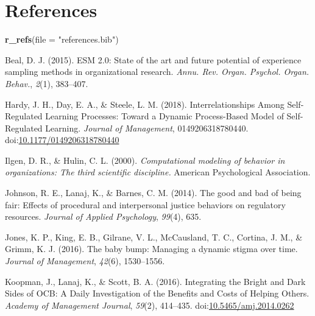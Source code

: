 \documentclass[english,,man]{apa6}
\newenvironment{Shaded}{\begin{snugshade}}{\end{snugshade}}
\newcommand{\DataTypeTok}[1]{\textcolor[rgb]{0.13,0.29,0.53}{#1}}
\newcommand{\KeywordTok}[1]{\textcolor[rgb]{0.13,0.29,0.53}{\textbf{#1}}}
\newcommand{\NormalTok}[1]{#1}
\newcommand{\StringTok}[1]{\textcolor[rgb]{0.31,0.60,0.02}{#1}}
\theoremstyle{definition}
\theoremstyle{definition}
\theoremstyle{definition}
\theoremstyle{remark}
\begin{document}
\newpage

\hypertarget{references}{%
\section{References}\label{references}}

\begin{Shaded}
\begin{Highlighting}[]
\KeywordTok{r_refs}\NormalTok{(}\DataTypeTok{file =} \StringTok{"references.bib"}\NormalTok{)}
\end{Highlighting}
\end{Shaded}

\setlength{\parindent}{-0.5in}
\setlength{\leftskip}{0.5in}

\hypertarget{refs}{}
\leavevmode\hypertarget{ref-beal_esm_2015}{}%
Beal, D. J. (2015). ESM 2.0: State of the art and future potential of
experience sampling methods in organizational research. \emph{Annu. Rev.
Organ. Psychol. Organ. Behav.}, \emph{2}(1), 383--407.

\leavevmode\hypertarget{ref-hardy_interrelationships_2018}{}%
Hardy, J. H., Day, E. A., \& Steele, L. M. (2018). Interrelationships
Among Self-Regulated Learning Processes: Toward a Dynamic Process-Based
Model of Self-Regulated Learning. \emph{Journal of Management},
0149206318780440.
doi:\href{https://doi.org/10.1177/0149206318780440}{10.1177/0149206318780440}

\leavevmode\hypertarget{ref-ilgen_computational_2000}{}%
Ilgen, D. R., \& Hulin, C. L. (2000). \emph{Computational modeling of
behavior in organizations: The third scientific discipline.} American
Psychological Association.

\leavevmode\hypertarget{ref-johnson_good_2014}{}%
Johnson, R. E., Lanaj, K., \& Barnes, C. M. (2014). The good and bad of
being fair: Effects of procedural and interpersonal justice behaviors on
regulatory resources. \emph{Journal of Applied Psychology},
\emph{99}(4), 635.

\leavevmode\hypertarget{ref-jones_baby_2016}{}%
Jones, K. P., King, E. B., Gilrane, V. L., McCausland, T. C., Cortina,
J. M., \& Grimm, K. J. (2016). The baby bump: Managing a dynamic stigma
over time. \emph{Journal of Management}, \emph{42}(6), 1530--1556.

\leavevmode\hypertarget{ref-koopman_integrating_2016}{}%
Koopman, J., Lanaj, K., \& Scott, B. A. (2016). Integrating the Bright
and Dark Sides of OCB: A Daily Investigation of the Benefits and Costs
of Helping Others. \emph{Academy of Management Journal}, \emph{59}(2),
414--435.
doi:\href{https://doi.org/10.5465/amj.2014.0262}{10.5465/amj.2014.0262}
\end{document}
